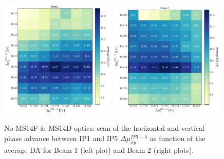 \documentclass{cernatsnote}
\begin{document}
\begin{figure}[h!]
\centering
\includegraphics[width=0.49\textwidth]{images/scan_noms14fms14dalt_avg_b1.pdf} \hfill \includegraphics[width=0.49\textwidth]{images/scan_noms14fms14dalt_avg_b2.pdf} \\
\caption{\label{da_scan_ms14fms14d} No MS14F \& MS14D optics: scan of the horizontal and vertical phase advance between IP1 and IP5 $\Delta\mu_{xy}^{IP1-5}$ as function of the average DA for Beam 1 (left plot) and Beam 2 (right plots).}
\end{figure}
\end{document}
